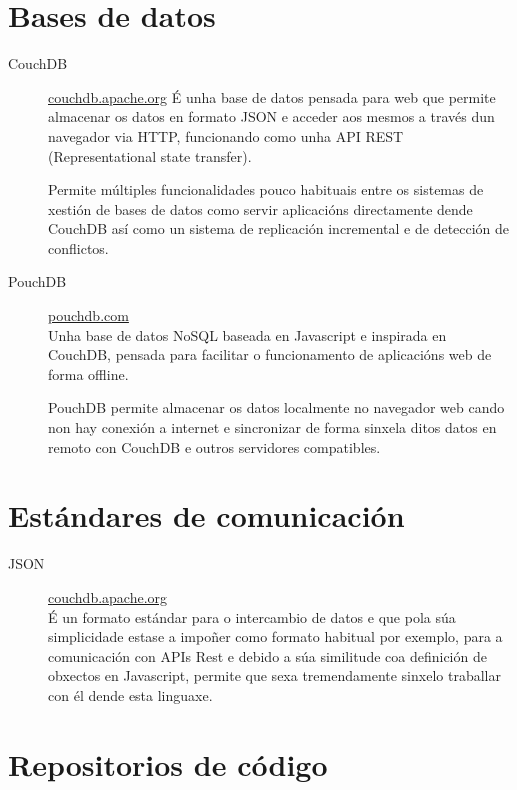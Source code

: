  \section{Bases de datos}

  \begin{description}

     \item [CouchDB] \href{http://couchdb.apache.org/}{couchdb.apache.org} É 
unha base de datos 
pensada para web que permite almacenar 
os datos en formato JSON e acceder aos mesmos a través dun navegador via HTTP, 
funcionando como unha API REST (Representational state 
transfer).

  Permite múltiples funcionalidades pouco habituais entre os sistemas de 
xestión de bases de datos como servir aplicacións directamente dende 
CouchDB así como un sistema de replicación incremental e de detección de 
conflictos.

     \item [PouchDB] \href{https://pouchdb.com/}{pouchdb.com}\\ Unha base de 
datos NoSQL 
baseada en Javascript e inspirada 
en CouchDB, pensada para facilitar o funcionamento de aplicacións web de forma 
offline.

PouchDB permite almacenar os datos localmente no navegador web cando non 
hay conexión a internet e sincronizar de forma sinxela ditos datos en remoto con 
CouchDB e outros servidores compatibles.%

  \end{description}

  \section{Estándares de comunicación}

  \begin{description}
   \item [JSON] \href{http://couchdb.apache.org/}{couchdb.apache.org}\\ É un 
formato estándar para o 
intercambio de datos e que pola súa 
simplicidade estase a impoñer como formato habitual por exemplo, para a comunicación con 
APIs Rest e debido a súa similitude coa definición de obxectos en Javascript, permite que 
sexa tremendamente sinxelo traballar con él dende esta linguaxe.
  \end{description}

  \section{Repositorios de código}

